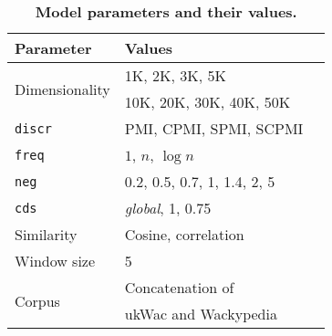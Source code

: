\begin{table}
  \centering
  \begin{tabular}{llc}
    \toprule
    Parameter & Values \\
    \midrule
    \multirow{2}{*}{Dimensionality} & 1K, 2K, 3K, 5K \\
                                    & 10K, 20K, 30K, 40K, 50K \\
    \texttt{discr} & PMI, CPMI, SPMI, SCPMI \\
    \texttt{freq} & $1$, $n$, $\log n$ \\
    \texttt{neg} & 0.2, 0.5, 0.7, 1, 1.4, 2, 5 \\
    \texttt{cds} & \textit{global}, 1, 0.75 \\
    Similarity & Cosine, correlation \\
    Window size & 5                                \\
    \multirow{2}{*}{Corpus} & Concatenation of \\
                            & ukWac and Wackypedia \\
    \bottomrule
  \end{tabular}
  \caption{\textbf{Model parameters and their values.}}
\label{tab:parameters}
\end{table}

